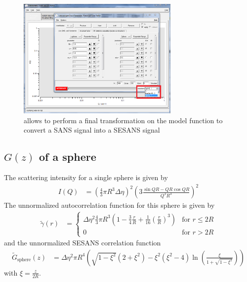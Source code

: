\begin{figure}[htb]
\begin{center}
\includegraphics[width=0.7\textwidth]{../images/GUI/HankelOperator.png}
\end{center}
\caption{\SASfit allows to perform a final transformation on the model function to convert a SANS signal into a SESANS signal}
\label{fig:HankelOp}
\end{figure}


\subsection{$G(z)$ of a sphere}
The scattering intensity for a single sphere is given by
\begin{align}
I(Q) &= \left(\frac{4}{3}\pi R^3 \Delta\eta\right)^2 \left(3\frac{\sin QR-QR\cos QR}{Q^3R^3}\right)^2
\end{align}
The unnormalized autocorrelation function for this sphere is given by
\begin{align}
\tilde{\gamma}(r) &=
\begin{cases}
 \Delta\eta^2  \frac{4}{3}\pi R^3 \left( 1-\frac{3}{4}\frac{r}{R}+\frac{1}{16}\left(\frac{r}{R}\right)^3\right) & \mbox{for } r\leq 2R \\
0 & \mbox{for }  r>2R
\end{cases}
\end{align}
and the unnormalized SESANS correlation function
\begin{align}
\tilde{G}_\mathrm{sphere}(z)&= \Delta\eta^2 \pi R^4 \left(\sqrt{1-\xi^2}(2+\xi^2)-\xi^2(\xi^2-4)\ln\left(\frac{\xi}{1+\sqrt{1-\xi^2}}\right)\right)
\end{align}
with $\xi=\frac{z}{2R}$.

